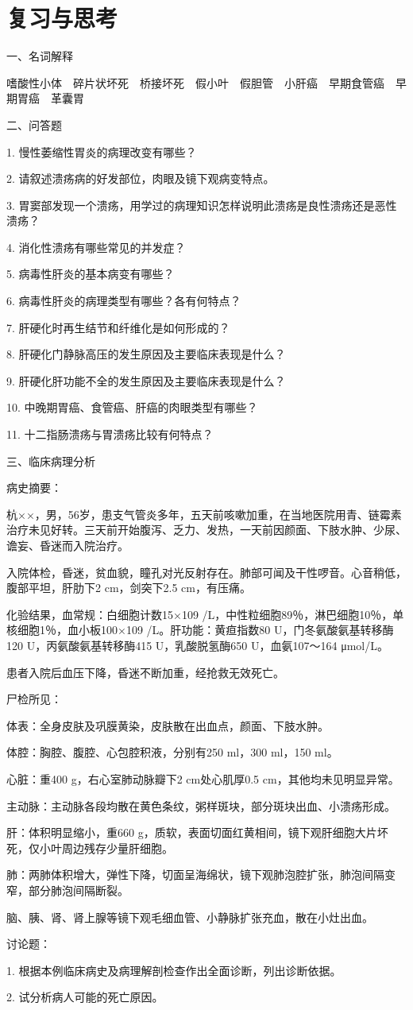 \section*{复习与思考}

{一、名词解释}

嗜酸性小体　碎片状坏死　桥接坏死　假小叶　假胆管　小肝癌　早期食管癌　早期胃癌　革囊胃

{二、问答题}

1. 慢性萎缩性胃炎的病理改变有哪些？

2. 请叙述溃疡病的好发部位，肉眼及镜下观病变特点。

3.
胃窦部发现一个溃疡，用学过的病理知识怎样说明此溃疡是良性溃疡还是恶性溃疡？

4. 消化性溃疡有哪些常见的并发症？

5. 病毒性肝炎的基本病变有哪些？

6. 病毒性肝炎的病理类型有哪些？各有何特点？

7. 肝硬化时再生结节和纤维化是如何形成的？

8. 肝硬化门静脉高压的发生原因及主要临床表现是什么？

9. 肝硬化肝功能不全的发生原因及主要临床表现是什么？

10. 中晚期胃癌、食管癌、肝癌的肉眼类型有哪些？

11. 十二指肠溃疡与胃溃疡比较有何特点？

{三、临床病理分析}

病史摘要：

杭××，男，56岁，患支气管炎多年，五天前咳嗽加重，在当地医院用青、链霉素治疗未见好转。三天前开始腹泻、乏力、发热，一天前因颜面、下肢水肿、少尿、谵妄、昏迷而入院治疗。

入院体检，昏迷，贫血貌，瞳孔对光反射存在。肺部可闻及干性啰音。心音稍低，腹部平坦，肝肋下2
cm，剑突下2.5 cm，有压痛。

化验结果，血常规：白细胞计数15×10{9}
/L，中性粒细胞89％，淋巴细胞10％，单核细胞1％，血小板100×10{9}
/L。肝功能：黄疸指数80 U，门冬氨酸氨基转移酶120 U，丙氨酸氨基转移酶415
U，乳酸脱氢酶650 U，血氨107～164 μmol/L。

患者入院后血压下降，昏迷不断加重，经抢救无效死亡。

尸检所见：

体表：全身皮肤及巩膜黄染，皮肤散在出血点，颜面、下肢水肿。

体腔：胸腔、腹腔、心包腔积液，分别有250 ml，300 ml，150 ml。

心脏：重400 g，右心室肺动脉瓣下2 cm处心肌厚0.5 cm，其他均未见明显异常。

主动脉：主动脉各段均散在黄色条纹，粥样斑块，部分斑块出血、小溃疡形成。

肝：体积明显缩小，重660
g，质软，表面切面红黄相间，镜下观肝细胞大片坏死，仅小叶周边残存少量肝细胞。

肺：两肺体积增大，弹性下降，切面呈海绵状，镜下观肺泡腔扩张，肺泡间隔变窄，部分肺泡间隔断裂。

脑、胰、肾、肾上腺等镜下观毛细血管、小静脉扩张充血，散在小灶出血。

讨论题：

1. 根据本例临床病史及病理解剖检查作出全面诊断，列出诊断依据。

2. 试分析病人可能的死亡原因。
